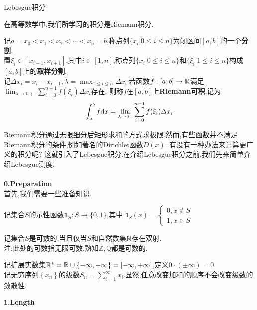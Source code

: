 \documentclass[a4paper]{ctexart}
\begin{document}
\pagestyle{empty}
\begin{center}
    \large Lebesgue积分
\end{center}
在高等数学中,我们所学习的积分是Riemann积分.
\begin{formal}
    记$a=x_0<x_1<x_2<\cdots<x_n=b$,称点列$\{x_i|0\leqslant i\leqslant n\}$为闭区间$[a,b]$的一个\textbf{\songti 分割}.\\
    置$\xi_i\in[x_{i-1},x_{i+1}]$,其中$i\in[1,n]$,称点列$\{x_i|0\leqslant i\leqslant n\}$和$\{\xi_i|1\leqslant i\leqslant n\}$构成$[a,b]$上的\textbf{\songti 取样分割}.\\
    记$\displaystyle\Delta x_i=x_i-x_{i-1},\lambda=\max_{1\leqslant i\leqslant n}\Delta x_i$,若函数$f:[a,b]\to\mathbb{R}$满足$\displaystyle\lim_{\lambda\to 0+}{\sum_{i=0}^{n-1}f(\xi_i)\Delta x_i}$存在,
    则称$f$在$[a,b]$上\textbf{Riemann\songti 可积},记为
    $$\displaystyle\int_a^bf\mathrm{d} x=\lim_{\lambda\to 0+}{\sum_{i=0}^{n-1}f(\xi_i)\Delta x_i}$$
\end{formal}\noindent
Riemann积分通过无限细分后矩形求和的方式求极限.然而,有些函数并不满足Riemann积分的条件,例如著名的Dirichlet函数$D(x)$.
有没有一种办法来计算更广义的积分呢?
这就引入了Lebesgue积分.在介绍Lebesgue积分之前,我们先来简单介绍Lebesgue测度.\\\\
\textbf{0.Preparation}\\首先,我们需要一些准备知识.
\begin{theorem}
    记集合$S$的示性函数$\mathbf{1}_S:S\to\{0,1\}$,其中
    $\displaystyle\mathbf{1}_S(x)=\left\{\begin{array}{l}0,x\notin S\\1,x\in S\end{array}\right.$
\end{theorem}
\begin{theorem}
    记集合$S$是可数的,当且仅当$S$和自然数集$\mathbb{N}$存在双射.\\
    注:此处的可数指无限可数.熟知$\mathbb{Z},\mathbb{Q}$都是可数的.
\end{theorem}
\begin{theorem}[0.3 扩展实数集与级数]
    记扩展实数集$\mathbb{R}^*=\mathbb{R}\cup\left\{-\infty,+\infty\right\}=[-\infty,+\infty]$,定义$0\cdot(\pm\infty)=0$.\\
    记无穷序列$\left\{x_n\right\}$的级数$\displaystyle S_n=\sum_{i=1}^{\infty}{x_i}$.显然,任意改变加和的顺序不会改变级数的敛散性.
\end{theorem}\noindent
\textbf{1.Length}\\
\end{document}
